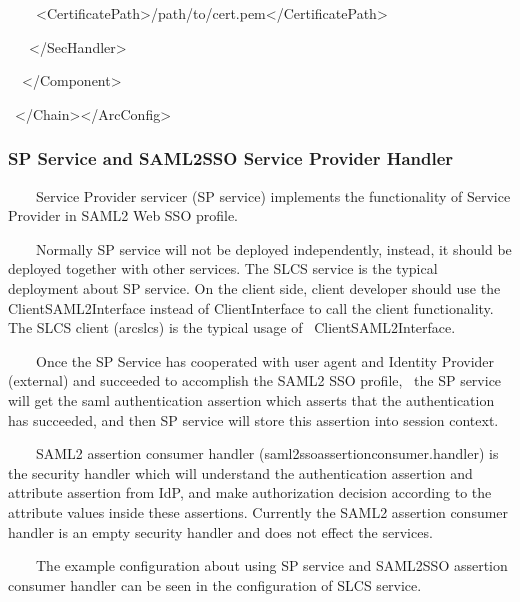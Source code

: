 \documentclass{article}
\begin{document}
{\ttfamily\color{black}
\ \ \ \ {\textless}CertificatePath{\textgreater}/path/to/cert.pem{\textless}/CertificatePath{\textgreater}}

{\ttfamily\color{black}
\ \ \ {\textless}/SecHandler{\textgreater}}

{\ttfamily\color{black}
\ \ {\textless}/Component{\textgreater}}

{\ttfamily\color{black}
\ {\textless}/Chain{\textgreater}{\textless}/ArcConfig{\textgreater}}


\bigskip

\subsubsection{SP Service and SAML2SSO Service Provider Handler}
{\color{black}
\ \ \ \ Service Provider servicer (SP service) implements the
functionality of Service Provider in SAML2 Web SSO profile.}

{\color{black}
\ \ \ \ Normally SP service will not be deployed independently, instead,
it should be deployed together with other services. The SLCS service is
the typical deployment about SP service. On the client side, client
developer should use the ClientSAML2Interface instead of
ClientInterface to call the client functionality. The SLCS client
(arcslcs) is the typical usage of \ ClientSAML2Interface.}

{\color{black}
\ \ \ \ Once the SP Service has cooperated with user agent and Identity
Provider (external) and succeeded to accomplish the SAML2 SSO profile,
\ the SP service will get the saml authentication assertion which
asserts that the authentication has succeeded, and then SP service will
store this assertion into session context.}

{\color{black}
\ \ \ \ SAML2 assertion consumer handler
(saml2ssoassertionconsumer.handler) is the security handler which will
understand the authentication assertion and attribute assertion from
IdP, and make authorization decision according to the attribute values
inside these assertions. Currently the SAML2 assertion consumer handler
is an empty security handler and does not effect the services.}

{\color{black}
\ \ \ \ The example configuration about using SP service and SAML2SSO
assertion consumer handler can be seen in the configuration of SLCS
service. }
\end{document}
